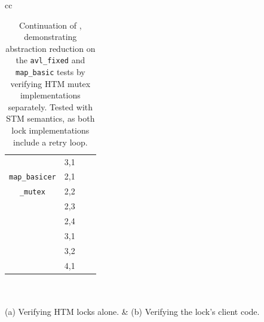 \begin{table}[t]
\begin{center}
\begin{tabular}{cc}
\begin{tabular}{cc||r|r}
			& 3,1 & \ETAdag{173d 17h} & \ETAdag{12572187} \\
			\cline{1-4}
			{\tt map\_basicer}
			& 2,1 & \cpu{14.34} & \ints{9} \\
			{\tt \_mutex}
			& 2,2 & \cpu{147.27} & \ints{2953} \\
			& 2,3 & \cpu{12946.21} & \ints{244691} \\
			& 2,4 & \ETAdag{2d 17h} & \ETAdag{1130184} \\
			& 3,1 & \cpu{637.81} & \ints{12707} \\
			& 3,2 & \ETAdag{102d 13h} & \ETAdag{13220616} \\
			& 4,1 & \ETAdag{33h 33m} & \ETAdag{1778661} \\
		\end{tabular}
		\\
		\\
		(a) Verifying HTM locks alone.
		&
		(b) Verifying the lock's client code.
		\end{tabular}
	\end{center}
	\caption[Continuation of , demonstrating abstraction reduction.]
		{Continuation of ,
		demonstrating abstraction reduction %
		on the {\tt avl\_fixed} and {\tt map\_basic} tests
		by verifying HTM mutex implementations separately.
		Tested with STM semantics, as both lock implementations include a retry loop.}
	\label{tab:tm-verifs2}
\end{table}

